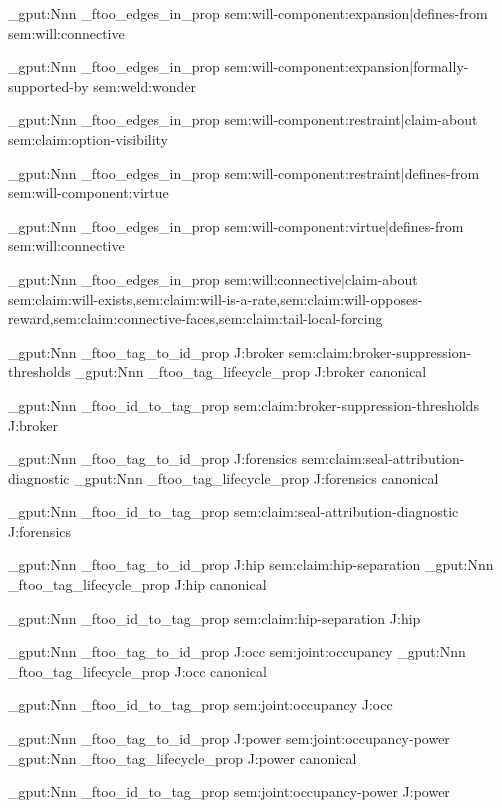 \prop_gput:Nnn \g_ftoo_edges_in_prop { sem:will-component:expansion|defines-from } { sem:will:connective }

\prop_gput:Nnn \g_ftoo_edges_in_prop { sem:will-component:expansion|formally-supported-by } { sem:weld:wonder }

\prop_gput:Nnn \g_ftoo_edges_in_prop { sem:will-component:restraint|claim-about } { sem:claim:option-visibility }

\prop_gput:Nnn \g_ftoo_edges_in_prop { sem:will-component:restraint|defines-from } { sem:will-component:virtue }

\prop_gput:Nnn \g_ftoo_edges_in_prop { sem:will-component:virtue|defines-from } { sem:will:connective }

\prop_gput:Nnn \g_ftoo_edges_in_prop { sem:will:connective|claim-about } { sem:claim:will-exists,sem:claim:will-is-a-rate,sem:claim:will-opposes-reward,sem:claim:connective-faces,sem:claim:tail-local-forcing }



\prop_gput:Nnn \g_ftoo_tag_to_id_prop { J:broker } { sem:claim:broker-suppression-thresholds }
\prop_gput:Nnn \g_ftoo_tag_lifecycle_prop { J:broker } { canonical }

\prop_gput:Nnn \g_ftoo_id_to_tag_prop { sem:claim:broker-suppression-thresholds } { J:broker }


\prop_gput:Nnn \g_ftoo_tag_to_id_prop { J:forensics } { sem:claim:seal-attribution-diagnostic }
\prop_gput:Nnn \g_ftoo_tag_lifecycle_prop { J:forensics } { canonical }

\prop_gput:Nnn \g_ftoo_id_to_tag_prop { sem:claim:seal-attribution-diagnostic } { J:forensics }


\prop_gput:Nnn \g_ftoo_tag_to_id_prop { J:hip } { sem:claim:hip-separation }
\prop_gput:Nnn \g_ftoo_tag_lifecycle_prop { J:hip } { canonical }

\prop_gput:Nnn \g_ftoo_id_to_tag_prop { sem:claim:hip-separation } { J:hip }


\prop_gput:Nnn \g_ftoo_tag_to_id_prop { J:occ } { sem:joint:occupancy }
\prop_gput:Nnn \g_ftoo_tag_lifecycle_prop { J:occ } { canonical }

\prop_gput:Nnn \g_ftoo_id_to_tag_prop { sem:joint:occupancy } { J:occ }


\prop_gput:Nnn \g_ftoo_tag_to_id_prop { J:power } { sem:joint:occupancy-power }
\prop_gput:Nnn \g_ftoo_tag_lifecycle_prop { J:power } { canonical }

\prop_gput:Nnn \g_ftoo_id_to_tag_prop { sem:joint:occupancy-power } { J:power }



